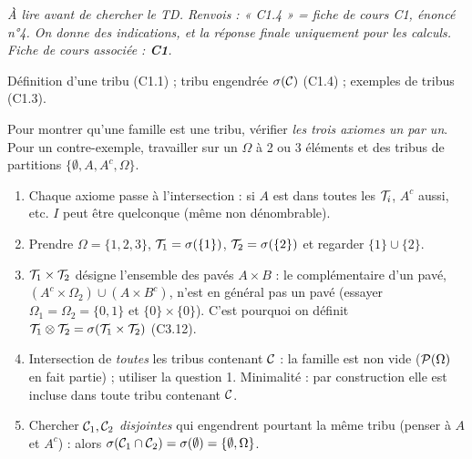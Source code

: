 \documentclass[11pt,a4paper]{article}
\begin{document}

\textit{À lire avant de chercher le TD. Renvois : « C1.4 » = fiche de cours C1, énoncé n°4. On donne des indications, et la réponse finale
uniquement pour les calculs. Fiche de cours associée : \textbf{C1}.}

\begin{exo}
\outils Définition d'une tribu (C1.1) ; tribu engendrée $\sigma(\mathcal{C})$ (C1.4) ; exemples de tribus (C1.3).

\meth Pour montrer qu'une famille est une tribu, vérifier \emph{les trois axiomes un par un}. Pour un contre-exemple, travailler sur
un $\Omega$ à 2 ou 3 éléments et des tribus de partitions $\{\emptyset,A,A^c,\Omega\}$.

\indic
\begin{enumerate}
  \item Chaque axiome passe à l'intersection : si $A$ est dans toutes les $\mathcal{T}_i$, $A^c$ aussi, etc. $I$ peut être quelconque (même non dénombrable).
  \item Prendre $\Omega=\{1,2,3\}$, $\mathcal{T}_1=\sigma(\{1\})$, $\mathcal{T}_2=\sigma(\{2\})$ et regarder $\{1\}\cup\{2\}$.
  \item $\mathcal{T}_1\times\mathcal{T}_2$ désigne l'ensemble des pavés $A\times B$ : le complémentaire d'un pavé, $(A^c\times\Omega_2)\cup(A\times B^c)$,
  n'est en général pas un pavé (essayer $\Omega_1=\Omega_2=\{0,1\}$ et $\{0\}\times\{0\}$). C'est pourquoi on définit $\mathcal{T}_1\otimes\mathcal{T}_2=\sigma(\mathcal{T}_1\times\mathcal{T}_2)$ (C3.12).
  \item Intersection de \emph{toutes} les tribus contenant $\mathcal{C}$ : la famille est non vide ($\mathcal{P}(\Omega)$ en fait partie) ; utiliser la question 1.
  Minimalité : par construction elle est incluse dans toute tribu contenant $\mathcal{C}$.
  \item Chercher $\mathcal{C}_1,\mathcal{C}_2$ \emph{disjointes} qui engendrent pourtant la même tribu (penser à $A$ et $A^c$) : alors $\sigma(\mathcal{C}_1\cap\mathcal{C}_2)=\sigma(\emptyset)=\{\emptyset,\Omega\}$.
\end{enumerate}
\end{exo}
\end{document}
